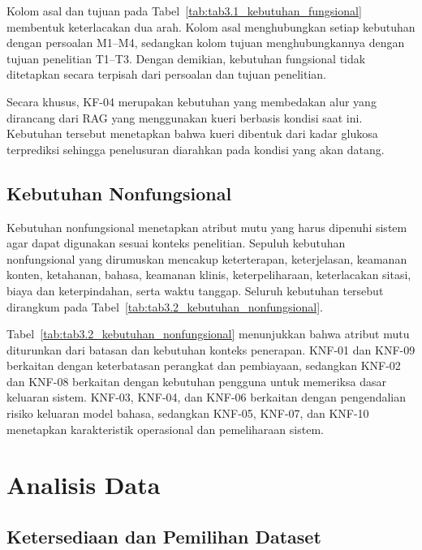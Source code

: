 Kolom asal dan tujuan pada Tabel~\ref{tab:tab3.1_kebutuhan_fungsional} membentuk keterlacakan dua arah. Kolom asal menghubungkan setiap kebutuhan dengan persoalan M1--M4, sedangkan kolom
tujuan menghubungkannya dengan tujuan penelitian T1--T3. Dengan demikian, kebutuhan fungsional tidak ditetapkan secara terpisah dari persoalan dan tujuan penelitian.

Secara khusus, KF-04 merupakan kebutuhan yang membedakan alur yang dirancang dari RAG yang menggunakan kueri berbasis kondisi saat ini. Kebutuhan tersebut menetapkan bahwa kueri
dibentuk dari kadar glukosa terprediksi sehingga penelusuran diarahkan pada kondisi yang akan datang.

\subsection{Kebutuhan Nonfungsional}
\label{subsec:bab3-kebutuhan-nonfungsional}
Kebutuhan nonfungsional menetapkan atribut mutu yang harus dipenuhi sistem agar dapat digunakan sesuai konteks penelitian. Sepuluh kebutuhan nonfungsional yang dirumuskan mencakup
keterterapan, keterjelasan, keamanan konten, ketahanan, bahasa, keamanan klinis, keterpeliharaan, keterlacakan sitasi, biaya dan keterpindahan, serta waktu tanggap. Seluruh kebutuhan
tersebut dirangkum pada Tabel~\ref{tab:tab3.2_kebutuhan_nonfungsional}.



Tabel~\ref{tab:tab3.2_kebutuhan_nonfungsional} menunjukkan bahwa atribut mutu diturunkan dari batasan dan kebutuhan konteks penerapan. KNF-01 dan KNF-09 berkaitan dengan keterbatasan
perangkat dan pembiayaan, sedangkan KNF-02 dan KNF-08 berkaitan dengan kebutuhan pengguna untuk memeriksa dasar keluaran sistem. KNF-03, KNF-04, dan KNF-06 berkaitan dengan pengendalian
risiko keluaran model bahasa, sedangkan KNF-05, KNF-07, dan KNF-10 menetapkan karakteristik operasional dan pemeliharaan sistem.

\section{Analisis Data} 
\label{sec:bab3-analisis-data}

\subsection{Ketersediaan dan Pemilihan Dataset} 
\label{subsec:bab3-ketersediaan-pemilihan-dataset}

